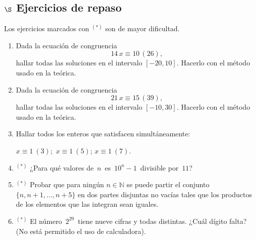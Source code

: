 \documentclass[a4paper,12pt,twoside,spanish,reqno]{amsbook}
\numberwithin{equation}{section}
\begin{document}
\subsection*{$\S$ Ejercicios de repaso} Los ejercicios marcados con ${}^{(*)}$ son de mayor dificultad.

\begin{enumerate}[resume]
\item Dada la ecuación de congruencia
$$14\,x\equiv 10 \, (26),$$
hallar todas las soluciones en el intervalo $[-20,10]$. Hacerlo con el método usado en la teórica.
\item Dada la ecuación de congruencia
$$21\,x\equiv 15 \, (39),$$
hallar todas las soluciones en el intervalo $[-10,30]$. Hacerlo con el método usado en la teórica. 

\item Hallar todos los enteros que satisfacen simultáneamente:

$x \equiv 1\ ( 3); $ \qquad $x \equiv 1 \ ( 5)$; \qquad $x \equiv 1\ ( 7)$.

\item${}^{(*)}$  ¿Para qué valores de \,$n$\, es \,$10^n-1$\, divisible por \,$11$?

\item${}^{(*)}$ Probar que para ning\'un $n\in\mathbb N$ se puede partir el conjunto $\{n,n+1,\ldots, n+5\}$ en dos partes disjuntas no vacías tales que los productos de los elementos que las integran sean iguales.

\item${}^{(*)}$  El número \,$2^{29}$\, tiene nueve cifras y todas distintas.
¿Cuál dígito falta? (No está permitido el uso de calculadora).

\end{enumerate}
\end{document}
